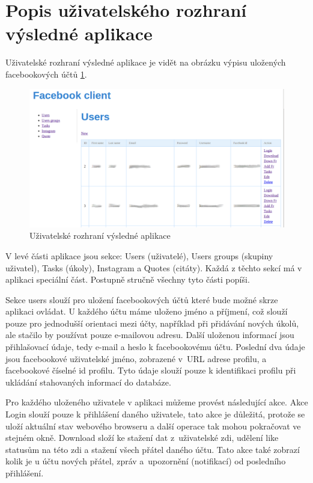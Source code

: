 \documentclass[thesis=M,czech]{FITthesis}[2013/05/10]
\begin{document}
\section{Popis uživatelského rozhraní výsledné aplikace}

Uživatelské rozhraní výsledné aplikace je vidět na obrázku výpisu uložených facebookových účtů \ref{fig:fcUI}.

\begin{figure}[h]
\begin{center}
\includegraphics[width=5in]{figures/fcUI.png}
\caption{Uživatelské rozhraní výsledné aplikace}
\label{fig:fcUI}
\end{center}
\end{figure}

V levé části aplikace jsou sekce: Users (uživatelé), Users groups (skupiny uživatel), Tasks (úkoly), Instagram a Quotes (citáty). Každá z těchto sekcí má v aplikaci speciální část. Postupně stručně všechny tyto části popíši.

Sekce users slouží pro uložení facebookových účtů které bude možné skrze aplikaci ovládat. U každého účtu máme uloženo jméno a příjmení, což slouží pouze pro jednodušší orientaci mezi účty, například při přidávání nových úkolů, ale stačilo by používat pouze e-mailovou adresu. Další uloženou informací jsou přihlašovací údaje, tedy e-mail a heslo k facebookovému účtu. Poslední dva údaje jsou facebookové uživatelské jméno, zobrazené v~URL adrese profilu, a facebookové číselné id profilu. Tyto údaje slouží pouze k identifikaci profilu při ukládání stahovaných informací do databáze. 

Pro každého uloženého uživatele v aplikaci můžeme provést následující akce. Akce Login slouží pouze k přihlášení daného uživatele, tato akce je důležitá, protože se uloží aktuální stav webového browseru a další operace tak mohou pokračovat ve stejném okně. Download složí ke stažení dat z~uživatelské zdi, udělení like statusům na této zdi a stažení všech přátel daného účtu. Tato akce také zobrazí kolik je u účtu nových přátel, zpráv a~upozornění (notifikací) od posledního přihlášení.
\end{document}

